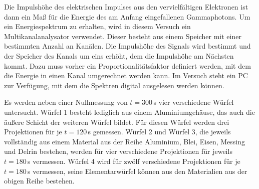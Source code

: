 Die Impulshöhe des elektrischen Impulses aus den vervielfältigen Elektronen ist dann ein Maß für die Energie des am Anfang eingefallenen Gammaphotons. Um ein Energiespektrum zu erhalten, wird in diesem Versuch ein Multikanalanalysator verwendet. Dieser besteht aus einem Speicher mit einer bestimmten Anzahl an Kanälen. Die Impulshöhe des Signals wird bestimmt und der Speicher des Kanals um eins erhöht, dem die Impulshöhe am Nächsten kommt. Dazu muss vorher ein Proportionalitätsfaktor definiert werden, mit dem die Energie in einen Kanal umgerechnet werden kann.
Im Versuch steht ein PC zur Verfügung, mit dem die Spektren digital ausgelesen werden können.

Es werden neben einer Nullmessung von $t=300$\,s vier verschiedene Würfel untersucht. Würfel 1 besteht lediglich aus einem Aluminiumgehäuse, das auch die äußere Schicht der weiteren Würfel bildet. Für diesen Würfel werden drei Projektionen für je $t=120$\,s gemessen. Würfel 2 und Würfel 3, die jeweils vollständig aus einem Material aus der Reihe Aluminium, Blei, Eisen, Messing und Delrin bestehen, werden für vier verschiedene Projektionen für jeweils $t=180$\,s vermessen. Würfel 4 wird für zwölf verschiedene Projektionen für je $t=180$\,s vermessen, seine Elementarwürfel können aus den Materialien aus der obigen Reihe bestehen.

